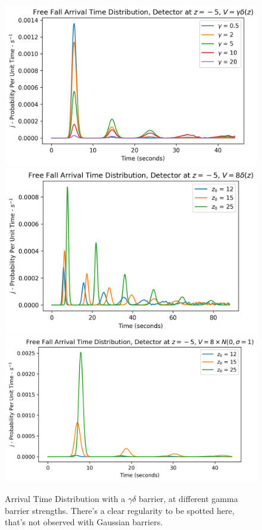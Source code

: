 \begin{figure}
    \centering
    \includegraphics[width=1\linewidth]{Figures//1d_arrival_time/freefall_diff_gammas.png}
    \includegraphics[width=1\linewidth]{Figures//1d_arrival_time/freefall_diff_heights.png}
    \includegraphics[width=1\linewidth]{Figures//1d_arrival_time/freefall_gaussian_different.png}
    \caption{Arrival Time Distribution with a $\gamma \delta$ barrier, at different gamma barrier strengths. There's a clear regularity to be spotted here, that's not observed with Gaussian barriers.}
    \label{fig:arrival_time_freefall_diff_gammas}
\end{figure}

